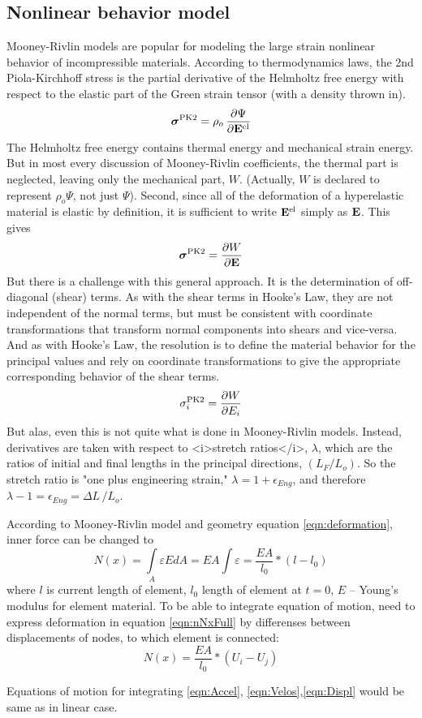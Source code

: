 \subsection{Nonlinear behavior model}\par
Mooney-Rivlin models are popular for modeling the large strain nonlinear
behavior of incompressible materials. According to thermodynamics laws, the
2nd Piola-Kirchhoff stress is the partial derivative of the Helmholtz free
energy with respect to the elastic part of the Green strain tensor (with a
density thrown in).
\[
\boldsymbol{\sigma}^\text{PK2} = \rho_o \, {\partial \Psi \over \partial {\bf
E}^\text{el} }
\]
The Helmholtz free energy contains thermal energy and mechanical strain
energy.  
But in most every discussion of Mooney-Rivlin coefficients, the thermal part
is neglected, leaving only the mechanical part, \(W\).  (Actually, \(W\) is
declared to represent \(\rho_o \Psi\), not just \(\Psi\)).  Second, since all
of the deformation of a hyperelastic material is elastic by definition, it is
sufficient to write \({\bf E}^\text{el}\) simply as \({\bf E}\). This gives
\[
\boldsymbol{\sigma}^\text{PK2} = {\partial W \over \partial {\bf E} }
\]
But there is a challenge with this general approach.  It is the determination
of off-diagonal (shear) terms.  As with the shear terms in Hooke's Law, they
are not independent of the normal terms, but must be consistent with
coordinate transformations that transform normal components into shears and
vice-versa. And as with Hooke's Law, the resolution is to define the material
behavior for the principal values and rely on coordinate transformations to
give the appropriate corresponding behavior of the shear terms.
\[
\sigma_i^\text{PK2} = {\partial W \over \partial E_i }
\]
But alas, even this is not quite what is done in Mooney-Rivlin models.
Instead, derivatives are taken with respect to <i>stretch ratios</i>,
\(\lambda\), which are the ratios of initial and final lengths in the
principal directions, \((L_F / L_o)\).  So the stretch ratio is "one plus
engineering strain,"  \(\lambda = 1 + \epsilon_{Eng}\), and therefore
\(\lambda - 1 = \epsilon_{Eng} = \Delta L \, / L_o\).

According to Mooney-Rivlin model and geometry equation
\eqref{eqn:deformation}, inner force can be changed to
\begin{equation}\label{eqn:nNxFull} N(x)= \int\limits_A \varepsilon EdA=EA\int
\varepsilon=\frac{EA}{l_0}*(l-l_0) \end{equation} where $l$ is current length
of element, $l_0$ length of element at $t=0$, $E$ – Young’s modulus for
element material. To be able to integrate equation of motion, need to express
deformation in equation \eqref{eqn:nNxFull} by differenses between
displacements of nodes, to which element is connected:
\begin{equation}\label{eqn:nNxWdispl} N(x)=\frac{EA}{l_0}*(U_{i}-U_{j})
\end{equation}\par Equations of motion for integrating \eqref{eqn:Accel},
\eqref{eqn:Velos},\eqref{eqn:Displ} would be same as in linear
case\textcite{Picault2014}. \par
\newpage